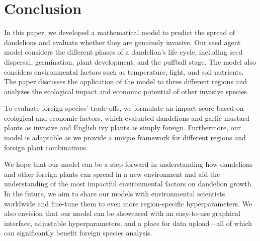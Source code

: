 \section{Conclusion}
In this paper, we developed a mathematical model to predict the spread of dandelions and evaluate whether they are genuinely invasive. Our seed agent model considers the different phases of a dandelion's life cycle, including seed dispersal, germination, plant development, and the puffball stage. The model also considers environmental factors such as temperature, light, and soil nutrients. The paper discusses the application of the model to three different regions and analyzes the ecological impact and economic potential of other invasive species.

To evaluate foreign species' trade-offs, we formulate an impact score based on ecological and economic factors, which evaluated dandelions and garlic mustard plants as invasive and English ivy plants as simply foreign. Furthermore, our model is adaptable as we provide a unique framework for different regions and foreign plant combinations. 

We hope that our model can be a step forward in understanding how dandelions and other foreign plants can spread in a new environment and aid the understanding of the most impactful environmental factors on dandelion growth. In the future, we aim to share our models with environmental scientists worldwide and fine-tune them to even more region-specific hyperparameters. We also envision that our model can be showcased with an easy-to-use graphical interface, adjustable hyperparameters, and a place for data upload—all of which can significantly benefit foreign species analysis. 